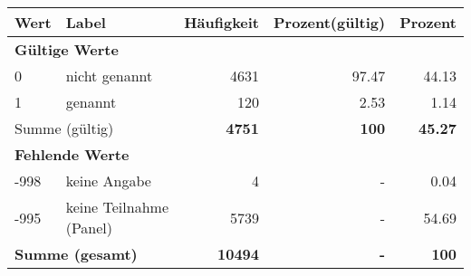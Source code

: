      \begin{longtable}{lXrrr}
     \toprule
     \textbf{Wert} & \textbf{Label} & \textbf{Häufigkeit} & \textbf{Prozent(gültig)} & \textbf{Prozent} \\
     \endhead
     \midrule
     \multicolumn{5}{l}{\textbf{Gültige Werte}}\\

     0 &
     \multicolumn{1}{X}{ nicht genannt   } &


       \num{4631} &
       \num[round-mode=places,round-precision=2]{97.47} &
         \num[round-mode=places,round-precision=2]{44.13} \\

     1 &
     \multicolumn{1}{X}{ genannt   } &


       \num{120} &
       \num[round-mode=places,round-precision=2]{2.53} &
         \num[round-mode=places,round-precision=2]{1.14} \\
     \midrule
     \multicolumn{2}{l}{Summe (gültig)} &
       \textbf{\num{4751}} &
     \textbf{\num{100}} &
       \textbf{\num[round-mode=places,round-precision=2]{45.27}} \\
     \multicolumn{5}{l}{\textbf{Fehlende Werte}}\\
       -998 &
       keine Angabe &
         \num{4} &
        - &
         \num[round-mode=places,round-precision=2]{0.04} \\
       -995 &
       keine Teilnahme (Panel) &
         \num{5739} &
        - &
         \num[round-mode=places,round-precision=2]{54.69} \\
     \midrule
     \multicolumn{2}{l}{\textbf{Summe (gesamt)}} &
          \textbf{\num{10494}} &
        \textbf{-} &
        \textbf{\num{100}} \\
     \bottomrule
     \end{longtable}
     
